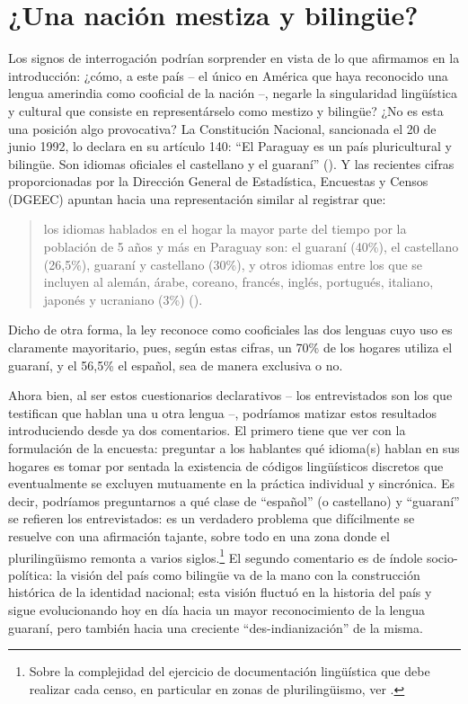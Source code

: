 \documentclass[output=paper]{langscibook}
\begin{document}
\section{¿Una nación mestiza y bilingüe?}


Los signos de interrogación podrían sorprender en vista de lo que afirmamos en la introducción: ¿cómo, a este país -- el único en América que haya reconocido una lengua amerindia como cooficial de la nación --, negarle la singularidad lingüística y cultural que consiste en representárselo como mestizo y bilingüe? ¿No es esta una posición algo provocativa? La Constitución Nacional, sancionada el 20 de junio 1992, lo declara en su artículo 140: “El Paraguay es un país pluricultural y bilingüe. Son idiomas oficiales el castellano y el guaraní” (\citealt{RepúblicadelParaguay1992}). Y las recientes cifras proporcionadas por la Dirección General de Estadística, Encuestas y Censos (DGEEC) apuntan hacia una representación similar al registrar que: 

\begin{quote}
los idiomas hablados en el hogar la mayor parte del tiempo por la población de 5 años y más en Paraguay son: el guaraní (40\%), el castellano (26,5\%), guaraní y castellano (30\%), y otros idiomas entre los que se incluyen al alemán, árabe, coreano, francés, inglés, portugués, italiano, japonés y ucraniano (3\%) (\citealt{RepúblicadelParaguay2018a}). 
\end{quote}


Dicho de otra forma, la ley reconoce como cooficiales las dos lenguas cuyo uso es claramente mayoritario, pues, según estas cifras, un 70\% de los hogares utiliza el guaraní, y el 56,5\% el español, sea de manera exclusiva o no. 

Ahora bien, al ser estos cuestionarios declarativos -- los entrevistados son los que testifican que hablan una u otra lengua --, podríamos matizar estos resultados introduciendo desde ya dos comentarios. El primero tiene que ver con la formulación de la encuesta: preguntar a los hablantes qué idioma(s) hablan en sus hogares es tomar por sentada la existencia de códigos lingüísticos discretos que eventualmente se excluyen mutuamente en la práctica individual y sincrónica. Es decir, podríamos preguntarnos a qué clase de “español” (o castellano) y “guaraní” se refieren los entrevistados: es un verdadero problema que difícilmente se resuelve con una afirmación tajante, sobre todo en una zona donde el plurilingüismo remonta a varios siglos.\footnote{Sobre la complejidad del ejercicio de documentación lingüística que debe realizar cada censo, en particular en zonas de plurilingüismo, ver \citet{HumbertEtAl2018}.} El segundo comentario es de índole socio-política: la visión del país como bilingüe va de la mano con la construcción histórica de la identidad nacional; esta visión fluctuó en la historia del país y sigue evolucionando hoy en día hacia un mayor reconocimiento de la lengua guaraní, pero también hacia una creciente “des-indianización” \citep{Boidin2014a} de la misma.
\end{document}
